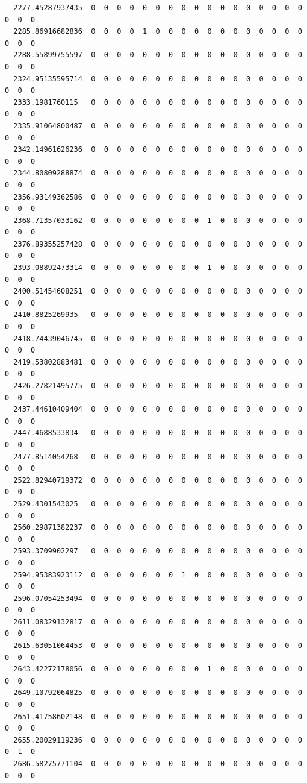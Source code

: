 \documentclass[
  letterpaper,
  DIV=11,
  numbers=noendperiod]{scrartcl}
\begin{document}
\begin{verbatim}
  2277.45287937435  0  0  0  0  0  0  0  0  0  0  0  0  0  0  0  0  0  0  0  0
  2285.86916682836  0  0  0  0  1  0  0  0  0  0  0  0  0  0  0  0  0  0  0  0
  2288.55899755597  0  0  0  0  0  0  0  0  0  0  0  0  0  0  0  0  0  0  0  0
  2324.95135595714  0  0  0  0  0  0  0  0  0  0  0  0  0  0  0  0  0  0  0  0
  2333.1981760115   0  0  0  0  0  0  0  0  0  0  0  0  0  0  0  0  0  0  0  0
  2335.91064800487  0  0  0  0  0  0  0  0  0  0  0  0  0  0  0  0  0  0  0  0
  2342.14961626236  0  0  0  0  0  0  0  0  0  0  0  0  0  0  0  0  0  0  0  0
  2344.80809288874  0  0  0  0  0  0  0  0  0  0  0  0  0  0  0  0  0  0  0  0
  2356.93149362586  0  0  0  0  0  0  0  0  0  0  0  0  0  0  0  0  0  0  0  0
  2368.71357033162  0  0  0  0  0  0  0  0  0  1  0  0  0  0  0  0  0  0  0  0
  2376.89355257428  0  0  0  0  0  0  0  0  0  0  0  0  0  0  0  0  0  0  0  0
  2393.08892473314  0  0  0  0  0  0  0  0  0  1  0  0  0  0  0  0  0  0  0  0
  2400.51454608251  0  0  0  0  0  0  0  0  0  0  0  0  0  0  0  0  0  0  0  0
  2410.8825269935   0  0  0  0  0  0  0  0  0  0  0  0  0  0  0  0  0  0  0  0
  2418.74439046745  0  0  0  0  0  0  0  0  0  0  0  0  0  0  0  0  0  0  0  0
  2419.53802883481  0  0  0  0  0  0  0  0  0  0  0  0  0  0  0  0  0  0  0  0
  2426.27821495775  0  0  0  0  0  0  0  0  0  0  0  0  0  0  0  0  0  0  0  0
  2437.44610409404  0  0  0  0  0  0  0  0  0  0  0  0  0  0  0  0  0  0  0  0
  2447.4688533834   0  0  0  0  0  0  0  0  0  0  0  0  0  0  0  0  0  0  0  0
  2477.8514054268   0  0  0  0  0  0  0  0  0  0  0  0  0  0  0  0  0  0  0  0
  2522.82940719372  0  0  0  0  0  0  0  0  0  0  0  0  0  0  0  0  0  0  0  0
  2529.4301543025   0  0  0  0  0  0  0  0  0  0  0  0  0  0  0  0  0  0  0  0
  2560.29871382237  0  0  0  0  0  0  0  0  0  0  0  0  0  0  0  0  0  0  0  0
  2593.3709902297   0  0  0  0  0  0  0  0  0  0  0  0  0  0  0  0  0  0  0  0
  2594.95383923112  0  0  0  0  0  0  0  1  0  0  0  0  0  0  0  0  0  0  0  0
  2596.07054253494  0  0  0  0  0  0  0  0  0  0  0  0  0  0  0  0  0  0  0  0
  2611.08329132817  0  0  0  0  0  0  0  0  0  0  0  0  0  0  0  0  0  0  0  0
  2615.63051064453  0  0  0  0  0  0  0  0  0  0  0  0  0  0  0  0  0  0  0  0
  2643.42272178056  0  0  0  0  0  0  0  0  0  1  0  0  0  0  0  0  0  0  0  0
  2649.10792064825  0  0  0  0  0  0  0  0  0  0  0  0  0  0  0  0  0  0  0  0
  2651.41758602148  0  0  0  0  0  0  0  0  0  0  0  0  0  0  0  0  0  0  0  0
  2655.20029119236  0  0  0  0  0  0  0  0  0  0  0  0  0  0  0  0  0  0  1  0
  2686.58275771104  0  0  0  0  0  0  0  0  0  0  0  0  0  0  0  0  0  0  0  0

\end{verbatim}
\end{document}
